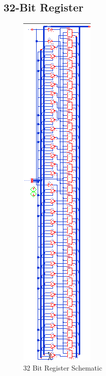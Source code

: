 \documentclass[11pt]{article}
\begin{document}
	\subsection{32-Bit Register}
	
		\begin{figure}[H] 
			\centering 
			\includegraphics[width=\textwidth,height=\dimexpr\textheight-4\baselineskip-\abovecaptionskip-\belowcaptionskip\relax,keepaspectratio]{"Pictures/nBitRegister 32-Bit Schematic"}
			\caption{32 Bit Register Schematic} 
			\label{fig:nBitRegister-32-Bit-Schematic} 
		\end{figure}
	
\end{document}

